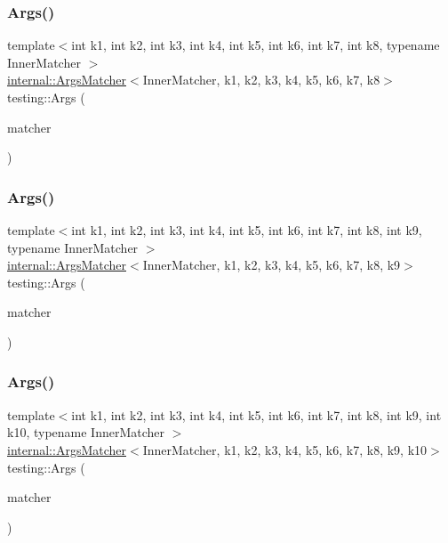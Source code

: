 \subsubsection{\texorpdfstring{Args()}{Args()}\hspace{0.1cm}{\footnotesize\ttfamily [9/11]}}
{\footnotesize\ttfamily template$<$int k1, int k2, int k3, int k4, int k5, int k6, int k7, int k8, typename Inner\+Matcher $>$ \\
\mbox{\hyperlink{classtesting_1_1internal_1_1_args_matcher}{internal\+::\+Args\+Matcher}}$<$Inner\+Matcher, k1, k2, k3, k4, k5, k6, k7, k8$>$ testing\+::\+Args (\begin{DoxyParamCaption}\item[{const Inner\+Matcher \&}]{matcher }\end{DoxyParamCaption})\hspace{0.3cm}{\ttfamily [inline]}}

\mbox{\label{namespacetesting_a62c877e01fb9098cd3c399f921bf4e3e}} 
\subsubsection{\texorpdfstring{Args()}{Args()}\hspace{0.1cm}{\footnotesize\ttfamily [10/11]}}
{\footnotesize\ttfamily template$<$int k1, int k2, int k3, int k4, int k5, int k6, int k7, int k8, int k9, typename Inner\+Matcher $>$ \\
\mbox{\hyperlink{classtesting_1_1internal_1_1_args_matcher}{internal\+::\+Args\+Matcher}}$<$Inner\+Matcher, k1, k2, k3, k4, k5, k6, k7, k8, k9$>$ testing\+::\+Args (\begin{DoxyParamCaption}\item[{const Inner\+Matcher \&}]{matcher }\end{DoxyParamCaption})\hspace{0.3cm}{\ttfamily [inline]}}

\mbox{\label{namespacetesting_a09ac462e8d6ed468cbfaa9c767aee0aa}} 
\subsubsection{\texorpdfstring{Args()}{Args()}\hspace{0.1cm}{\footnotesize\ttfamily [11/11]}}
{\footnotesize\ttfamily template$<$int k1, int k2, int k3, int k4, int k5, int k6, int k7, int k8, int k9, int k10, typename Inner\+Matcher $>$ \\
\mbox{\hyperlink{classtesting_1_1internal_1_1_args_matcher}{internal\+::\+Args\+Matcher}}$<$Inner\+Matcher, k1, k2, k3, k4, k5, k6, k7, k8, k9, k10$>$ testing\+::\+Args (\begin{DoxyParamCaption}\item[{const Inner\+Matcher \&}]{matcher }\end{DoxyParamCaption})\hspace{0.3cm}{\ttfamily [inline]}}


